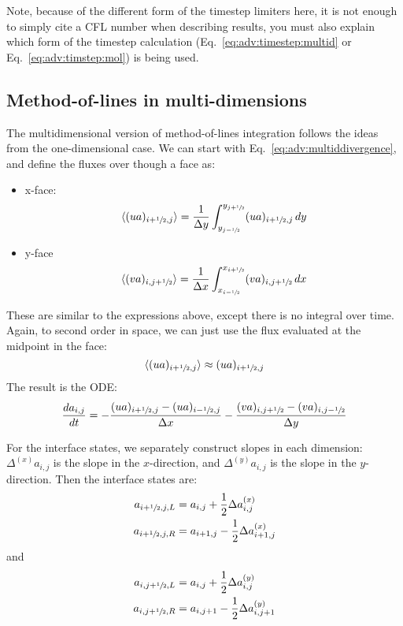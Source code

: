 Note, because of the different form of the timestep limiters here, it
is not enough to simply cite a CFL number when describing results, you
must also explain which form of the timestep calculation
(Eq.~\ref{eq:adv:timestep:multid} or Eq.~\ref{eq:adv:timstep:mol}) is
being used.

\subsection{Method-of-lines in multi-dimensions}

The multidimensional version of method-of-lines integration
follows the ideas from the one-dimensional case.
We can start with Eq.~\ref{eq:adv:multiddivergence}, and define
the fluxes over though a face as:
\begin{itemize}
\item x-face:
\begin{equation}
\langle (ua)_{i+{\sfrac{1}{2}},j} \rangle = \frac{1}{\Delta y}
    \int_{y_{j-{\sfrac{1}{2}}}}^{y_{j+{\sfrac{1}{2}}}} (ua)_{i+{\sfrac{1}{2}},j}\, dy
\end{equation}
\item y-face
\begin{equation}
\langle (va)_{i,j+{\sfrac{1}{2}}} \rangle = \frac{1}{\Delta x}
    \int_{x_{i-{\sfrac{1}{2}}}}^{x_{i+{\sfrac{1}{2}}}} (va)_{i,j+{\sfrac{1}{2}}}\, dx
\end{equation}
\end{itemize}
These are similar to the expressions above, except there is no
integral over time.  Again, to second order in space, we can just
use the flux evaluated at the midpoint in the face:
\begin{equation}
\langle (ua)_{i+{\sfrac{1}{2}},j} \rangle \approx (ua)_{i+{\sfrac{1}{2}},j}
\end{equation}
The result is the ODE:
\begin{equation}
\frac{d a_{i,j}}{d t} =
   - \frac{(ua)_{i+{\sfrac{1}{2}},j} - (ua)_{i-{\sfrac{1}{2}},j}}{\Delta x}
   - \frac{(va)_{i,j+{\sfrac{1}{2}}} - (va)_{i,j-{\sfrac{1}{2}}}}{\Delta y}
\end{equation}

For the interface states, we separately construct slopes in each
dimension: $\Delta^{(x)}a_{i,j}$ is the slope in the $x$-direction,
and $\Delta^{(y)}a_{i,j}$ is the slope in the $y$-direction.  Then
the interface states are:
\begin{align}
a_{i+{\sfrac{1}{2}},j,L} &= a_{i,j} + \frac{1}{2} \Delta a^{(x)}_{i,j} \\
a_{i+{\sfrac{1}{2}},j,R} &= a_{i+1,j} - \frac{1}{2} \Delta a^{(x)}_{i+1,j}
\end{align}
and
\begin{align}
a_{i,j+{\sfrac{1}{2}},L} &= a_{i,j} + \frac{1}{2} \Delta a^{(y)}_{i,j} \\
a_{i,j+{\sfrac{1}{2}},R} &= a_{i,j+1} - \frac{1}{2} \Delta a^{(y)}_{i,j+1}
\end{align}

